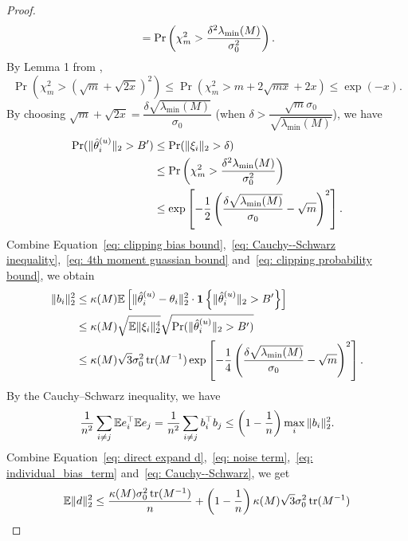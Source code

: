 \begin{proof}
\[{}
=\operatorname{Pr}
\Bra{
\chi^2_m > \dfrac{\delta^2 \lambda_{\min}(M)}{\sigma_0^2}
}.
\]
By Lemma 1 from \citet{laurent2000adaptive},
\begin{equation}
\operatorname{Pr}(\chi^2_m > (\sqrt{m}+\sqrt{2x})^2)
\le
\operatorname{Pr}(\chi^2_m > m + 2\sqrt{mx} + 2x)\le \exp(-x).
\label{eq: chi_square bound}
\end{equation}
By choosing $\sqrt{m}+\sqrt{2x} = \dfrac{\delta\sqrt{\lambda_{\min}(M)}}{\sigma_0}$ (when $\delta>\dfrac{\sqrt{m}\sigma_0}{\sqrt{\lambda_{\min}(M)}}$), we have
\begin{align}
\operatorname{Pr}(\|\hat{\theta}_i^{(u)}\|_2>B')
&\le
\operatorname{Pr}(\|\xi_i\|_2>\delta)
\nonumber\\
&\le
\operatorname{Pr}
\Bra{
\chi^2_m > \dfrac{\delta^2 \lambda_{\min}(M)}{\sigma_0^2}
}
\nonumber\\
&\le
\exp\SqBra{
-\dfrac{1}{2}\Bra{
\dfrac{\delta\sqrt{\lambda_{\min}(M)}}{\sigma_0}
- \sqrt{m}
}^2
}.
\label{eq: clipping probability bound}
\end{align}
Combine Equation~\eqref{eq: clipping bias bound},~\eqref{eq: Cauchy--Schwarz inequality},~\eqref{eq: 4th moment guassian bound} and~\eqref{eq: clipping probability bound}, we obtain
\begin{align}
\|b_i\|_2^2
&\le
\kappa(M) \mathbb E \SqBra{
\|\hat{\theta}_i^{(u)} - \theta_i\|_2^2
\cdot \mathbf{1} \Set{\|\hat{\theta}_i^{(u)}\|_2>B'}
}
\nonumber\\
&\le
\kappa(M)
\sqrt{\mathbb E \|\xi_i\|_2^4} \sqrt{\operatorname{Pr}(\|\hat{\theta}_i^{(u)}\|_2>B')}
\nonumber\\
&\le
\kappa(M)
\sqrt{3} \sigma_0^2 \operatorname{tr}(M^{-1})
\exp\SqBra{
-\dfrac{1}{4}\Bra{
\dfrac{\delta\sqrt{\lambda_{\min}(M)}}{\sigma_0}
- \sqrt{m}
}^2
}.
\label{eq: individual_bias_term}
\end{align}
By the Cauchy--Schwarz inequality, we have
\begin{equation}
\dfrac{1}{n^2} \sum_{i\ne j} \mathbb E e_i^\top \mathbb E e_j
=
\dfrac{1}{n^2} \sum_{i\ne j} b_i^\top b_j
\le
\Bra{1-\dfrac{1}{n}} \max_{i} \|b_i\|^2_2.
\label{eq: Cauchy--Schwarz}
\end{equation}
Combine Equation~\eqref{eq: direct expand d},~\eqref{eq: noise term},~\eqref{eq: individual_bias_term} and~\eqref{eq: Cauchy--Schwarz}, we get
\begin{equation}
\mathbb E\|d\|_2^2
\leq
\dfrac{\kappa(M)\sigma_0^2
\operatorname{tr}(M^{-1})}{n}
+
\Bra{1-\dfrac{1}{n}}
\kappa(M)
\sqrt{3} \sigma_0^2 \operatorname{tr}(M^{-1})

\end{equation}
\end{proof}
